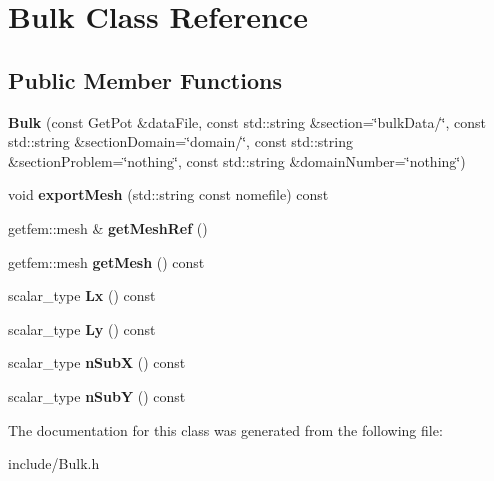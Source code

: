 \hypertarget{classBulk}{}\section{Bulk Class Reference}
\label{classBulk}
\subsection*{Public Member Functions}
\begin{DoxyCompactItemize}
\item 
\mbox{\label{classBulk_a52311ede3fef330f838101a940549cea}} 
{\bfseries Bulk} (const Get\+Pot \&data\+File, const std\+::string \&section=\char`\"{}bulk\+Data/\char`\"{}, const std\+::string \&section\+Domain=\char`\"{}domain/\char`\"{}, const std\+::string \&section\+Problem=\char`\"{}nothing\char`\"{}, const std\+::string \&domain\+Number=\char`\"{}nothing\char`\"{})
\item 
\mbox{\label{classBulk_ab54e35b72fef70d7842a2e001a63b489}} 
void {\bfseries export\+Mesh} (std\+::string const nomefile) const
\item 
\mbox{\label{classBulk_a720b2466afc7935d8faa7df5b4fa86d2}} 
getfem\+::mesh \& {\bfseries get\+Mesh\+Ref} ()
\item 
\mbox{\label{classBulk_abb9ee278cc489a52a07b802efdf7299f}} 
getfem\+::mesh {\bfseries get\+Mesh} () const
\item 
\mbox{\label{classBulk_a9c779bc19573844daa5762ddf804e06b}} 
scalar\+\_\+type {\bfseries Lx} () const
\item 
\mbox{\label{classBulk_a89999939678abaab470a80fba071b919}} 
scalar\+\_\+type {\bfseries Ly} () const
\item 
\mbox{\label{classBulk_a559078ee075212bb5e6d84d575cefd46}} 
scalar\+\_\+type {\bfseries n\+SubX} () const
\item 
\mbox{\label{classBulk_adfe15f93582879cdf187c8ce56ccd758}} 
scalar\+\_\+type {\bfseries n\+SubY} () const
\end{DoxyCompactItemize}


The documentation for this class was generated from the following file\+:\begin{DoxyCompactItemize}
\item 
include/Bulk.\+h\end{DoxyCompactItemize}
